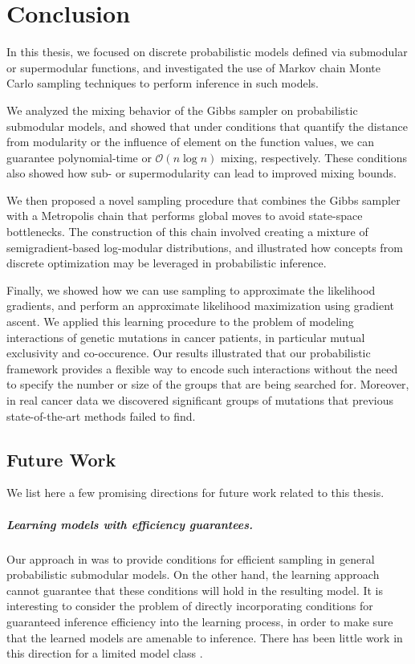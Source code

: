 \chapter{Conclusion} \label{ch:conclusion}

In this thesis, we focused on discrete probabilistic models defined via submodular or supermodular functions, and investigated the use of Markov chain Monte Carlo sampling techniques to perform inference in such models.

We analyzed the mixing behavior of the Gibbs sampler on probabilistic submodular models, and showed that under conditions that quantify the distance from modularity or the influence of element on the function values, we can guarantee polynomial-time or $\mathcal{O}(n\log n)$ mixing, respectively.
These conditions also showed how sub- or supermodularity can lead to improved mixing bounds.

We then proposed a novel sampling procedure that combines the Gibbs sampler with a Metropolis chain that performs global moves to avoid state-space bottlenecks.
The construction of this chain involved creating a mixture of semigradient-based log-modular distributions, and illustrated how concepts from discrete optimization may be leveraged in probabilistic inference.

Finally, we showed how we can use sampling to approximate the likelihood gradients, and perform an approximate likelihood maximization using gradient ascent.
We applied this learning procedure to the problem of modeling interactions of genetic mutations in cancer patients, in particular mutual exclusivity and co-occurence.
Our results illustrated that our probabilistic framework provides a flexible way to encode such interactions without the need to specify the number or size of the groups that are being searched for.
Moreover, in real cancer data we discovered significant groups of mutations that previous state-of-the-art methods failed to find.

\section{Future Work}
We list here a few promising directions for future work related to this thesis.

\paragraph{Learning models with efficiency guarantees.}
Our approach in  was to provide conditions for efficient sampling in general probabilistic submodular models.
On the other hand, the learning approach  cannot guarantee that these conditions will hold in the resulting model.
It is interesting to consider the problem of directly incorporating conditions for guaranteed inference efficiency into the learning process, in order to make sure that the learned models are amenable to inference.
There has been little work in this direction for a limited model class \citep{domke15}.

